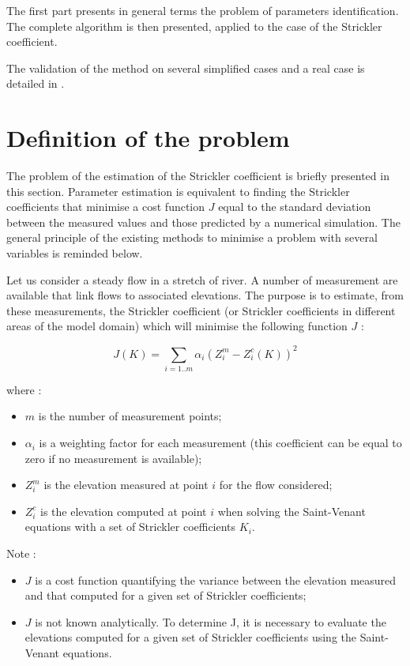 The first part presents in general terms the problem of parameters identification. The complete algorithm is then presented, applied to the case of the Strickler coefficient.

The validation of the method on several simplified cases and a real case is detailed in \cite{GOUTAL05}.

\section{Definition of the problem}
\label{PosPb}

The problem of the estimation of the Strickler coefficient is briefly presented in this section. Parameter estimation is equivalent to finding the Strickler coefficients that minimise a cost function $J$ equal to the standard deviation between the measured values and those predicted by a numerical simulation. The general principle of the existing methods to minimise a problem with several variables is reminded below.

Let us consider a steady flow in a stretch of river. A number of measurement are available that link flows to associated elevations. The purpose is to estimate, from these measurements, the Strickler coefficient (or Strickler coefficients in different areas of the model domain) which will minimise the following function $J$ :

\begin{equation}
 J(K) = \sum_{i=1..m} \alpha_i ( Z_{i}^m - Z_{i}^c (K) )^2
\end{equation}

where :
\begin{itemize}
 \item $m$ is the number of measurement points;
 \item $\alpha_i$ is a weighting factor for each measurement (this coefficient can be equal to zero if no measurement is available);
 \item $Z_{i}^m$ is the elevation measured at point $i$ for the flow considered;
 \item $Z_{i}^c$ is the elevation computed at point $i$ when solving the Saint-Venant equations with a set of Strickler coefficients $K_i$.
\end{itemize}

\begin{CommentBlock}{Note :}
\begin{itemize}
 \item $J$ is a cost function quantifying the variance between the elevation measured and that computed for a given set of Strickler coefficients;
 \item $J$ is not known analytically. To determine J, it is necessary to evaluate the elevations computed for a given set of Strickler coefficients using the Saint-Venant equations.
\end{itemize}
\end{CommentBlock}

